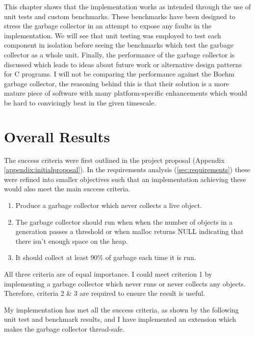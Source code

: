 \documentclass[../diss.tex]{subfiles}
\begin{document}
This chapter shows that the implementation works as intended through the use of unit tests and custom benchmarks. These benchmarks have been designed to stress the garbage collector in an attempt to expose any faults in the implementation. We will see that unit testing was employed to test each component in isolation before seeing the benchmarks which test the garbage collector as a whole unit. Finally, the performance of the garbage collector is discussed which leads to ideas about future work or alternative design patterns for C programs. I will not be comparing the performance against the Boehm garbage collector, the reasoning behind this is that their solution is a more mature piece of software with many platform-specific enhancements which would be hard to convicingly beat in the given timescale.

\section{Overall Results} \label{sec:overallresults}


The success criteria were first outlined in the project proposal (Appendix \ref{appendix:initialproposal}). In the requirements analysis (\cref{sec:requirements}) these were refined into smaller objectives such that an implementation achieving these would also meet the main success criteria.

\begin{enumerate}
    \item Produce a garbage collector which never collects a live object.
    \item The garbage collector should run when when the number of objects in a generation passes a threshold or when malloc returns NULL indicating that there isn't enough space on the heap.
    \item  It should collect at least 90\% of garbage each time it is run.
\end{enumerate}
 
All three criteria are of equal importance. I could meet criterion 1 by implementing a garbage collector which never runs or never collects any objects. Therefore, criteria 2 \& 3 are required to ensure the result is useful.

My implementation has met all the success criteria, as shown by the following unit test and benchmark results, and I have implemented an extension which makes the garbage collector thread-safe.
\end{document}
